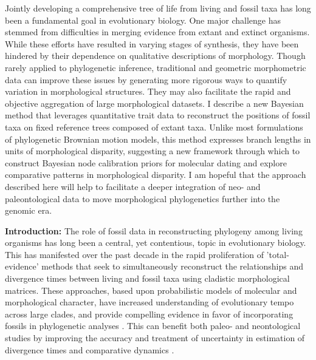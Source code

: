 \documentclass[12pt]{article}
\begin{document}
Jointly developing a comprehensive tree of life  from living and fossil taxa has long been a fundamental goal in evolutionary biology. One major challenge has stemmed from difficulties in merging evidence  from extant and extinct organisms.  While these efforts	 have resulted in varying stages of synthesis, they have been hindered by their dependence on  qualitative descriptions of morphology. Though rarely applied to phylogenetic inference, traditional and geometric morphometric data can improve these issues by generating more rigorous ways to quantify variation in morphological structures. They may also facilitate the rapid and objective aggregation of large morphological datasets. I describe a new Bayesian method that leverages quantitative trait data to reconstruct the positions of fossil taxa on fixed reference trees composed of extant taxa. Unlike most formulations of phylogenetic Brownian motion models, this method expresses branch lengths in units of morphological disparity, suggesting a new framework through which to construct Bayesian node calibration priors for molecular dating and explore comparative patterns in morphological disparity. I am hopeful that the approach described here will help to facilitate a deeper integration of neo- and paleontological data to move morphological phylogenetics further into the genomic era.

\newpage

\noindent\textbf{Introduction:} The role of fossil data in reconstructing
phylogeny among living organisms has long been a central, yet
contentious, topic in evolutionary biology. This has manifested over the past decade
in the rapid proliferation of 'total-evidence' methods that seek to simultaneously reconstruct the relationships
and divergence times between living and fossil taxa using cladistic morphological matrices.
 These approaches, based upon probabilistic models of molecular and
morphological character, have increased understanding of evolutionary tempo across large clades,
and provide compelling evidence in favor of incorporating fossils in
phylogenetic analyses \citep{pyron2011divergence,ronquist2012total}. This can
 benefit both paleo- and neontological studies by improving the accuracy and treatment of
uncertainty in estimation of divergence times and comparative dynamics \citep{slater2012integrating,guindon2018accounting}.
\end{document}
